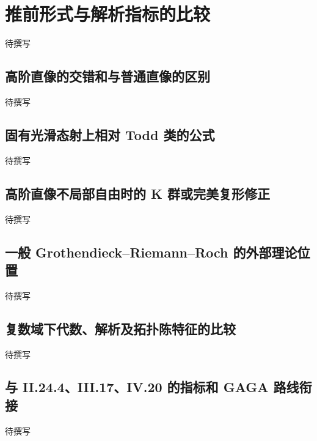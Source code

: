 
% 
% 
% 
% 
% 
% 

\section{推前形式与解析指标的比较}
\label{g5:sec:2707}

待撰写

\subsection{高阶直像的交错和与普通直像的区别}
\label{g5:subsec:2707:01}
待撰写

\subsection{固有光滑态射上相对 Todd 类的公式}
\label{g5:subsec:2707:02}
待撰写

\subsection{高阶直像不局部自由时的 K 群或完美复形修正}
\label{g5:subsec:2707:03}
待撰写

\subsection{一般 Grothendieck–Riemann–Roch 的外部理论位置}
\label{g5:subsec:2707:04}
待撰写

\subsection{复数域下代数、解析及拓扑陈特征的比较}
\label{g5:subsec:2707:05}
待撰写

\subsection{与 II.24.4、III.17、IV.20 的指标和 GAGA 路线衔接}
\label{g5:subsec:2707:06}
待撰写
